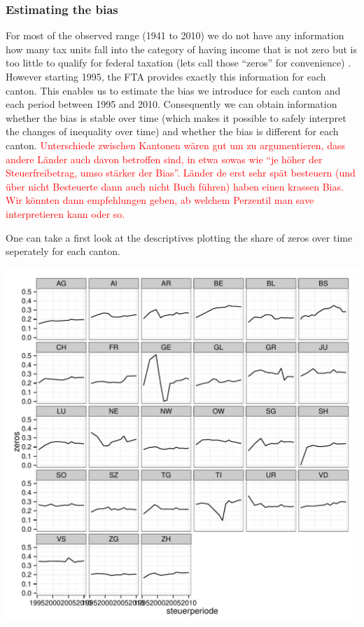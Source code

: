 \documentclass[twoside]{article}\usepackage[]{graphicx}\usepackage[]{color}
\makeatletter
\def\maxwidth{ %
  \ifdim\Gin@nat@width>\linewidth
    \linewidth
  \else
    \Gin@nat@width
  \fi
}
\newenvironment{knitrout}{}{} %
\makeatother
\begin{document}
\begin{multicols}{2}
\subsubsection{Estimating the bias}
For most of the observed range (1941 to 2010) we do not have any information how many tax units fall into the category of having income that is not zero but is too little to qualify for federal taxation (lets call those ``zeros'' for convenience) . However starting 1995, the FTA provides exactly this information for each canton. This enables us to estimate the bias we introduce for each canton and each period between 1995 and 2010. Consequently we can obtain information whether the bias is stable over time (which makes it possible to safely interpret the changes of inequality over time) and whether the bias is different for each canton. \textcolor{red}{Unterschiede zwischen Kantonen wären gut um zu argumentieren, dass andere Länder auch davon betroffen sind, in etwa sowas wie ``je höher der Steuerfreibetrag, umso stärker der Bias''. Länder de erst sehr spät besteuern (und über nicht Besteuerte dann auch nicht Buch führen) haben einen krassen Bias. Wir könnten dann empfehlungen geben, ab welchem Perzentil man save interpretieren kann oder so.}

One can take a first look at the descriptives plotting the share of zeros over time seperately for each canton.




\begin{knitrout}
\color{fgcolor}
\includegraphics[width=\maxwidth]{figure/zero_descriptives1} 


\end{knitrout}
\end{multicols}
\end{document}
